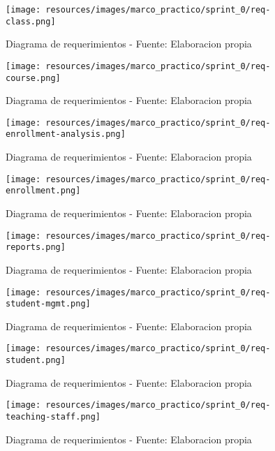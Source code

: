 \begin{figure}
    \texttt{[image: resources/images/marco\_practico/sprint\_0/req-class.png]}
    \caption{Diagrama de requerimientos - Fuente: Elaboracion propia}\label{fig:req-class}
\end{figure}
\begin{figure}
    \texttt{[image: resources/images/marco\_practico/sprint\_0/req-course.png]}
    \caption{Diagrama de requerimientos - Fuente: Elaboracion propia}\label{fig:req-course}
\end{figure}
\begin{figure}
    \texttt{[image: resources/images/marco\_practico/sprint\_0/req-enrollment-analysis.png]}
    \caption{Diagrama de requerimientos - Fuente: Elaboracion propia}\label{fig:req-enrollment-analysis}
\end{figure}
\begin{figure}
    \texttt{[image: resources/images/marco\_practico/sprint\_0/req-enrollment.png]}
    \caption{Diagrama de requerimientos - Fuente: Elaboracion propia}\label{fig:req-enrollment}
\end{figure}
\begin{figure}
    \texttt{[image: resources/images/marco\_practico/sprint\_0/req-reports.png]}
    \caption{Diagrama de requerimientos - Fuente: Elaboracion propia}\label{fig:req-reports}
\end{figure}
\begin{figure}
    \texttt{[image: resources/images/marco\_practico/sprint\_0/req-student-mgmt.png]}
    \caption{Diagrama de requerimientos - Fuente: Elaboracion propia}\label{fig:req-student-mgmt}
\end{figure}
\begin{figure}
    \texttt{[image: resources/images/marco\_practico/sprint\_0/req-student.png]}
    \caption{Diagrama de requerimientos - Fuente: Elaboracion propia}\label{fig:req-student}
\end{figure}
\begin{figure}
    \texttt{[image: resources/images/marco\_practico/sprint\_0/req-teaching-staff.png]}
    \caption{Diagrama de requerimientos - Fuente: Elaboracion propia}\label{fig:req-teaching-staff}
\end{figure}

